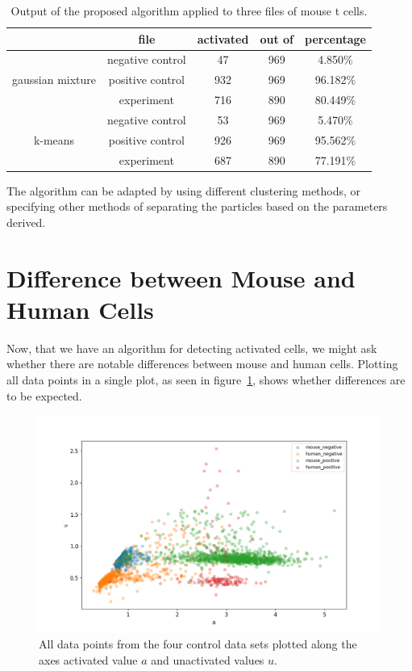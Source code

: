 \begin{table}[h]
	\centering
	\begin{tabular}{|c|c|c|c|c|}
		\hline
		 & file & activated & out of & percentage\\
		 \hline
		  & negative control & 47 & 969 & 4.850\%\\
		 gaussian mixture & positive control & 932 & 969 & 96.182\%\\
		  & experiment & 716 & 890 & 80.449\%\\
		 \hline
		  & negative control & 53 & 969 & 5.470\%\\
		 k-means & positive control & 926 & 969 & 95.562\%\\
		  & experiment & 687 & 890 & 77.191\%\\
		 \hline
	\end{tabular}
	\caption{Output of the proposed algorithm applied to three files of mouse t cells.}
	\label{tab:results_main_algorithm}
\end{table}

The algorithm can be adapted by using different clustering methods, or specifying other methods of separating the particles based on the parameters derived.

\section{Difference between Mouse and Human Cells}
\label{sec:differences_between_mouse_and_human_cells}

Now, that we have an algorithm for detecting activated cells, we might ask whether there are notable differences between mouse and human cells. Plotting all data points in a single plot, as seen in figure~\ref{fig:all_cells}, shows whether differences are to be expected.

\begin{figure}[h]
	\centering
	\includegraphics[width=\textwidth]{fig/all_cells}
	
	\caption{All data points from the four control data sets plotted along the axes activated value $a$ and unactivated values $u$.}
	\label{fig:all_cells}
\end{figure}

